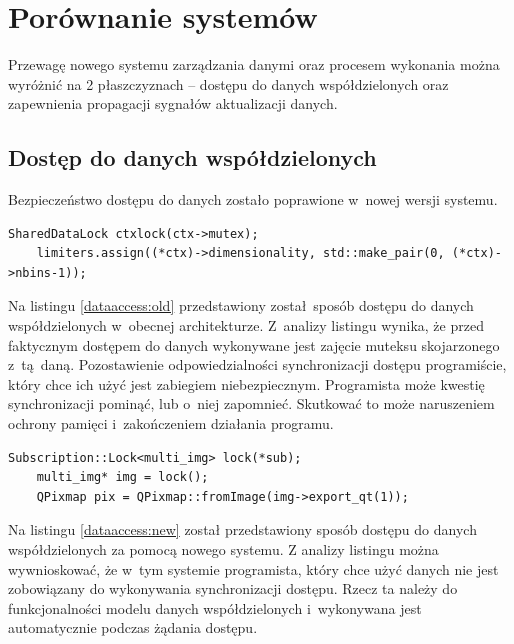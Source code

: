 \section{Porównanie systemów}
Przewagę nowego systemu zarządzania danymi oraz procesem wykonania można wyróżnić na 2 płaszczyznach -- dostępu do danych współdzielonych oraz zapewnienia propagacji sygnałów aktualizacji danych.

\subsection{Dostęp do danych współdzielonych}

Bezpieczeństwo dostępu do danych zostało poprawione w~nowej wersji systemu.


\begin{minipage}{\textwidth}
	\begin{lstlisting}[label=dataaccess:old, caption={Przykład dostępu do danych według bieżącego systemu},alsoletter={()[].=}]
	SharedDataLock ctxlock(ctx->mutex);
	limiters.assign((*ctx)->dimensionality, std::make_pair(0, (*ctx)->nbins-1));
	\end{lstlisting}
\end{minipage}

Na listingu \ref{dataaccess:old} przedstawiony został sposób dostępu do danych współdzielonych w~obecnej architekturze. Z~analizy listingu wynika, że przed faktycznym dostępem do danych wykonywane jest zajęcie muteksu skojarzonego z~tą daną. Pozostawienie odpowiedzialności synchronizacji dostępu programiście, który chce ich użyć jest zabiegiem niebezpiecznym. Programista może kwestię synchronizacji pominąć, lub o~niej zapomnieć. Skutkować to może naruszeniem ochrony pamięci i~zakończeniem działania programu.

\begin{minipage}{\textwidth}
	\begin{lstlisting}[label=dataaccess:new, caption={Przykład dostępu do danych według nowego systemu},alsoletter={()[].=}]
	Subscription::Lock<multi_img> lock(*sub);
	multi_img* img = lock();
	QPixmap pix = QPixmap::fromImage(img->export_qt(1));
	\end{lstlisting}
\end{minipage}

Na listingu \ref{dataaccess:new} został przedstawiony sposób dostępu do danych współdzielonych za pomocą nowego systemu. Z analizy listingu można wywnioskować, że w~tym systemie programista, który chce użyć danych nie jest zobowiązany do wykonywania synchronizacji dostępu. Rzecz ta należy do funkcjonalności modelu danych współdzielonych i~wykonywana jest automatycznie podczas żądania dostępu.

